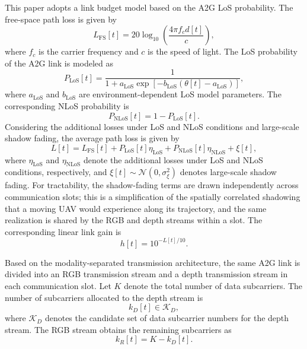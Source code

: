 \documentclass[journal]{IEEEtran}
\begin{document}
This paper adopts a link budget model based on the A2G LoS probability. The free-space path loss is given by
\begin{equation}
L_{\mathrm{FS}}[t]
=
20\log_{10}
\left(
\frac{4\pi f_c d[t]}{c}
\right),
\end{equation}
where $f_c$ is the carrier frequency and $c$ is the speed of light. The LoS probability of the A2G link is modeled as
\begin{equation}
P_{\mathrm{LoS}}[t]
=
\frac{1}
{
1
+
a_{\mathrm{LoS}}
\exp
\left[
-
b_{\mathrm{LoS}}
\left(
\theta[t]
-
a_{\mathrm{LoS}}
\right)
\right]
},
\end{equation}
where $a_{\mathrm{LoS}}$ and $b_{\mathrm{LoS}}$ are environment-dependent LoS model parameters. The corresponding NLoS probability is
\begin{equation}
P_{\mathrm{NLoS}}[t]
=
1-P_{\mathrm{LoS}}[t].
\end{equation}
Considering the additional losses under LoS and NLoS conditions and large-scale shadow fading, the average path loss is given by
\begin{equation}
L[t]
=
L_{\mathrm{FS}}[t]
+
P_{\mathrm{LoS}}[t]\eta_{\mathrm{LoS}}
+
P_{\mathrm{NLoS}}[t]\eta_{\mathrm{NLoS}}
+
\xi[t],
\end{equation}
where $\eta_{\mathrm{LoS}}$ and $\eta_{\mathrm{NLoS}}$ denote the additional losses under LoS and NLoS conditions, respectively, and $\xi[t]\sim\mathcal{N}(0,\sigma_{\xi}^{2})$ denotes large-scale shadow fading. For tractability, the shadow-fading terms are drawn independently across communication slots; this is a simplification of the spatially correlated shadowing that a moving UAV would experience along its trajectory, and the same realization is shared by the RGB and depth streams within a slot. The corresponding linear link gain is
\begin{equation}
h[t]
=
10^{-L[t]/10}.
\end{equation}

Based on the modality-separated transmission architecture, the same A2G link is divided into an RGB transmission stream and a depth transmission stream in each communication slot. Let $K$ denote the total number of data subcarriers. The number of subcarriers allocated to the depth stream is
\begin{equation}
k_D[t]
\in
\mathcal{K}_D,
\end{equation}
where $\mathcal{K}_D$ denotes the candidate set of data subcarrier numbers for the depth stream. The RGB stream obtains the remaining subcarriers as
\begin{equation}
k_R[t]
=
K-k_D[t].
\end{equation}
\end{document}
